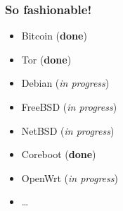 \documentclass[14pt]{beamer}
\begin{document}
\begin{frame}[plain]
\end{frame}

\begin{frame}
 \frametitle{So fashionable!}

 \begin{itemize}
 \item Bitcoin (\textbf{done})
 \item Tor (\textbf{done})
 \item Debian (\emph{in progress})
 \item FreeBSD (\emph{in progress})
 \item NetBSD (\emph{in progress})
 \item Coreboot (\textbf{done})
 \item OpenWrt (\emph{in progress})
 \item \ldots{}
\end{itemize}

\end{frame}
\end{document}
